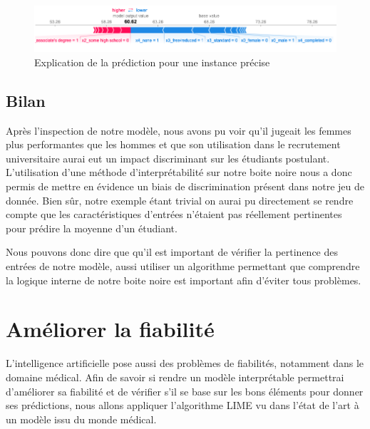 \begin{figure}[h]
    \includegraphics[scale=0.5]{src_img/shapPlotLocal.png}
    \caption{Explication de la prédiction pour une instance précise}
    \label{shapPlotLocal}
\end{figure}

\subsection{Bilan}
 Après l'inspection de notre modèle, nous avons pu voir qu'il jugeait les femmes plus performantes que les hommes et que son utilisation dans le recrutement universitaire aurai eut un impact discriminant sur les étudiants postulant. L'utilisation d'une méthode d'interprétabilité sur notre boite noire nous a donc permis de mettre en évidence un biais de discrimination présent dans notre jeu de donnée. Bien sûr, notre exemple étant trivial on aurai pu directement se rendre compte que les caractéristiques d'entrées n'étaient pas réellement pertinentes pour prédire la moyenne d'un étudiant.\par
 Nous pouvons donc dire que qu'il est important de vérifier la pertinence des entrées de notre modèle, aussi utiliser un algorithme permettant que comprendre la logique interne de notre boite noire est important afin d'éviter tous problèmes.

\section{Améliorer la fiabilité}
L'intelligence artificielle pose aussi des problèmes de fiabilités, notamment dans le domaine médical. Afin de savoir si rendre un modèle interprétable permettrai d'améliorer sa fiabilité et de vérifier s'il se base sur les bons éléments pour donner ses prédictions, nous allons appliquer l'algorithme LIME vu dans l'état de l'art à un modèle issu du monde médical.

